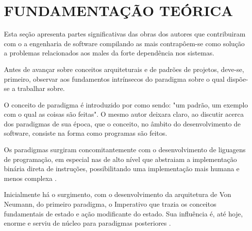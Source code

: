 


\section{\textbf{FUNDAMENTAÇÃO TEÓRICA}}
    \label{cha:fundamentacao-teorica}



    Esta seção apresenta partes significativas das obras dos autores que contribuiram
    com o a engenharia de software compilando as mais contrapôem-se como solução a
    problemas relacionados aos males da forte dependência nos sistemas.

    Antes de avançar sobre conceitos arquiteturais e de padrões de projetos, deve-se, primeiro,
    observar aos fundamentos intrínsecos do paradigma sobre o qual dispõe-se a trabalhar sobre.
    
    O conceito de paradigma é introduzido por 
    como sendo: "um padrão, um exemplo com o qual as coisas são feitas". O mesmo autor
    deixara claro, ao discutir acerca dos paradigmas de sua época, que o conceito, no
    âmbito do desenvolvimento de software, consiste na forma como programas são feitos.

    Os paradigmas surgiram concomitantemente com o desenvolvimento de liguagens de
    programação, em especial nas de alto nível que abstraiam a implementação binária
    direta de instruções, possibilitando uma implementação mais humana e menos complexa
    \cite[p.~8-]{Sammet1969languages}.

    Inicialmente há o surgimento, com o desenvolvimento da arquitetura de Von Neumann,
    do primeiro paradigma, o Imperativo que trazia os conceitos fundamentais de estado
    e ação modificante do estado. Sua influência é, até hoje, enorme e serviu de núcleo
    para paradigmas posteriores \cite[p.~1]{jungthon2009paradigmas}.

